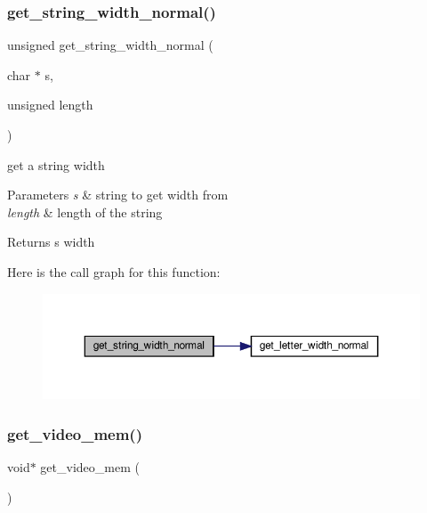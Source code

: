 \subsubsection{\texorpdfstring{get\+\_\+string\+\_\+width\+\_\+normal()}{get\_string\_width\_normal()}}
{\footnotesize\ttfamily unsigned get\+\_\+string\+\_\+width\+\_\+normal (\begin{DoxyParamCaption}\item[{char $\ast$}]{s,  }\item[{unsigned}]{length }\end{DoxyParamCaption})}



get a string width 


\begin{DoxyParams}{Parameters}
{\em s} & string to get width from \\
\hline
{\em length} & length of the string\\
\hline
\end{DoxyParams}
\begin{DoxyReturn}{Returns}
s width 
\end{DoxyReturn}
Here is the call graph for this function\+:\nopagebreak
\begin{figure}[H]
\begin{center}
\leavevmode
\includegraphics[width=350pt]{group__Video_gaefb95d930fabc3645326297ed5d37b63_cgraph}
\end{center}
\end{figure}
\mbox{\label{group__Video_ga1d04069f4e8b1556a7a1ed2cd95bfdea}} 
\subsubsection{\texorpdfstring{get\+\_\+video\+\_\+mem()}{get\_video\_mem()}}
{\footnotesize\ttfamily void$\ast$ get\+\_\+video\+\_\+mem (\begin{DoxyParamCaption}{ }\end{DoxyParamCaption})}



